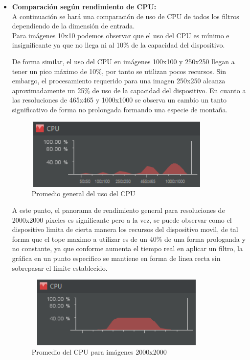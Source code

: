 \documentclass[journal]{IEEEtran}
\begin{document}
\begin{itemize}
	\item{\bf Comparación según rendimiento de CPU:} \\
	A continuación se hará una comparación de uso de CPU de todos los filtros dependiendo de la dimensión de entrada. \\
	Para imágenes 10x10 podemos observar que el uso del CPU es mínimo e insignificante ya que no llega ni al 10\% de la capacidad del dispositivo.

	De forma similar, el uso del CPU en imágenes 100x100 y 250x250 llegan a tener un pico máximo de 10\%, por tanto se utilizan pocos recursos. Sin embargo, el procesamiento requerido para una imagen 250x250 alcanza aproximadamente un 25\% de uso de la capacidad del dispositivo. En cuanto a las resoluciones de 465x465 y 1000x1000 se observa un cambio un tanto significativo de forma no prolongada formando una especie de montaña.

	\begin{figure}[h]
		\centering
		\includegraphics[height= 100pt, width=260pt]{rendimiento2.png}
		\caption{Promedio general del uso del CPU}
	\end{figure}

	A este punto, el panorama de rendimiento general para resoluciones de 2000x2000 pixeles es significante pero a la vez, se puede observar como el dispositivo limita de cierta manera los recursos del dispositivo movil, de tal forma que el tope maximo a utilizar es de un 40\% de una forma prologanda y no constante, ya que conforme aumenta el tiempo real en aplicar un filtro, la gráfica en un punto especifico se mantiene en forma de linea recta sin sobrepasar el limite establecido.

	\begin{figure}[h!]
		\centering
		\includegraphics[height= 100pt, width=260pt]{2000x2000.png}
		\caption{Promedio del CPU para imágenes 2000x2000}
	\end{figure}


\end{itemize}
\end{document}
